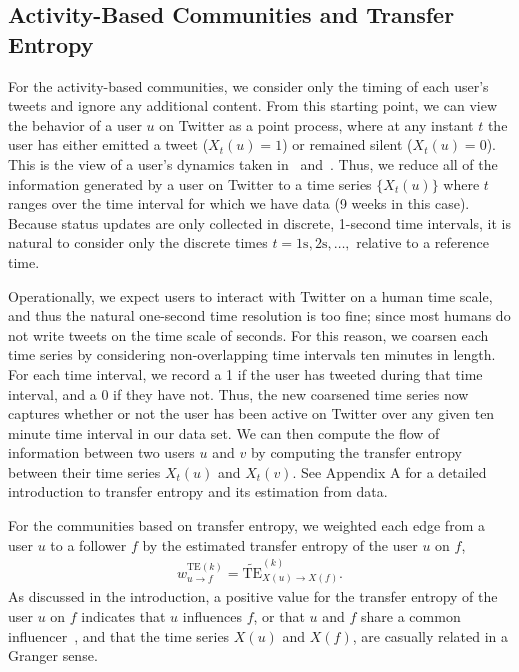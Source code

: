 \subsection{Activity-Based Communities and Transfer Entropy}
\label{sec:method-activity}

For the activity-based communities, we consider only the timing of each user's tweets and ignore any additional content. From this starting point, we can view the behavior of a user $u$ on Twitter as a point process, where at any instant $t$ the user has either emitted a tweet ($X_{t}(u) = 1$) or remained silent ($X_{t}(u) = 0$). This is the view of a user's dynamics taken in~\cite{darmon2013understanding} and~\cite{ver2012information}. Thus, we reduce all of the information generated by a user on Twitter to a time series $\{ X_{t}(u)\}$ where $t$ ranges over the time interval for which we have data (9 weeks in this case). Because status updates are only collected in discrete, 1-second time intervals, it is natural to consider only the discrete times $t = 1 \text{s}, 2 \text{s}, \ldots, $ relative to a reference time. 

Operationally, we expect users to interact with Twitter on a human time scale, and thus the natural one-second time resolution is too fine; since most humans do not write tweets on the time scale of seconds. For this reason, we coarsen each time series by considering non-overlapping time intervals ten minutes in length. For each time interval, we record a 1 if the user has tweeted during that time interval, and a 0 if they have not. Thus, the new coarsened time series now captures whether or not the user has been active on Twitter over any given ten minute time interval in our data set. We can then compute the flow of information between two users $u$ and $v$ by computing the transfer entropy between their time series $X_{t}(u)$ and $X_{t}(v).$ See Appendix A for a detailed introduction to transfer entropy and its estimation from data.



For the communities based on transfer entropy, we weighted each edge from a user $u$ to a follower $f$ by the estimated transfer entropy of the user $u$ on $f$, 
\begin{align}
	w_{u \to f}^{\text{TE}(k)} = \widetilde{\text{TE}}_{X(u) \to X(f)}^{(k)}. \label{Eqn-EW-activity}
\end{align}
As discussed in the introduction, a positive value for the transfer entropy of the user $u$ on $f$ indicates that $u$ influences $f$, or that $u$ and $f$ share a common influencer~\cite{ver2012information}, and that the time series $X(u)$ and $X(f)$, are casually related in a Granger sense.  

